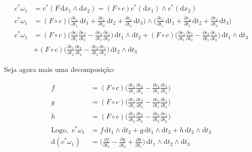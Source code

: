 \documentclass[12pt,a4paper]{article}
\begin{document}
		\begin{align}
			c^*\omega_1 &= c^*(F \,\mathrm{d}x_1 \wedge\mathrm{d}x_2) = (F \circ c) c^*(\mathrm{d}x_1) \wedge c^*(\mathrm{d}x_2) \label{VinteNove} \\
			c^*\omega_1 &= (F \circ c) \biggl(\frac{\partial c_1}{\partial t_1} \,\mathrm{d}t_1 + \frac{\partial c_1}{\partial t_2} \,\mathrm{d}t_2 + \frac{\partial c_1}{\partial t_3} \,\mathrm{d}t_3 \biggl)
				\wedge \biggl(\frac{\partial c_2}{\partial t_1} \,\mathrm{d}t_1 + \frac{\partial c_2}{\partial t_2} \,\mathrm{d}t_2 + \frac{\partial c_2}{\partial t_3} \,\mathrm{d}t_3 \biggl) \\
			c^*\omega_1 &= (F \circ c) \biggl(\frac{\partial c_1}{\partial t_1} \frac{\partial c_2}{\partial t_2} - \frac{\partial c_2}{\partial t_1} \frac{\partial c_1}{\partial t_2} \biggl) \,\mathrm{d}t_1 \wedge \mathrm{d}t_2
				+ (F \circ c) \biggl(\frac{\partial c_1}{\partial t_1} \frac{\partial c_2}{\partial t_3} - \frac{\partial c_2}{\partial t_1} \frac{\partial c_1}{\partial t_3} \biggl) \,\mathrm{d}t_1 \wedge \mathrm{d}t_3 \\
				&+ (F \circ c) \biggl(\frac{\partial c_1}{\partial t_2} \frac{\partial c_2}{\partial t_3} - \frac{\partial c_2}{\partial t_2} \frac{\partial c_1}{\partial t_3} \biggl) \,\mathrm{d}t_2 \wedge \mathrm{d}t_3
		\end{align}

		Seja agora mais uma decomposi\c{c}\~ao:

		\begin{align}
			f &= (F \circ c) \biggl(\frac{\partial c_1}{\partial t_1} \frac{\partial c_2}{\partial t_2} - \frac{\partial c_2}{\partial t_1} \frac{\partial c_1}{\partial t_2} \biggl) \\
			g &= (F \circ c) \biggl(\frac{\partial c_1}{\partial t_1} \frac{\partial c_2}{\partial t_3} - \frac{\partial c_2}{\partial t_1} \frac{\partial c_1}{\partial t_3} \biggl) \\
			h	&= (F \circ c) \biggl(\frac{\partial c_1}{\partial t_2} \frac{\partial c_2}{\partial t_3} - \frac{\partial c_2}{\partial t_2} \frac{\partial c_1}{\partial t_3} \biggl) \\
			\mathrm{Logo,\,\,} c^*\omega_1 &= f \,\mathrm{d}t_1 \wedge \mathrm{d}t_2 + g \,\mathrm{d}t_1 \wedge \mathrm{d}t_3 + h \,\mathrm{d}t_2 \wedge \mathrm{d}t_3 \\
			\mathrm{d}(c^*\omega_1) &= \biggl( \frac{\partial f}{\partial t_3} - \frac{\partial g}{\partial t_2} + \frac{\partial h}{\partial t_1} \biggl) \,\mathrm{d}t_1 \wedge \mathrm{d}t_2 \wedge \mathrm{d}t_3 \label{TrintaQuatro}
		\end{align}
\end{document}
